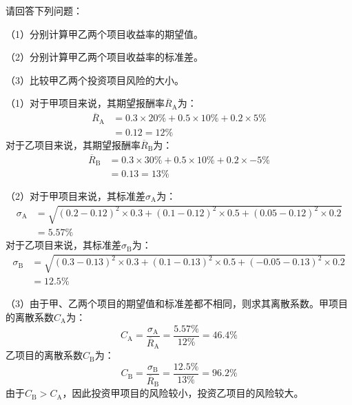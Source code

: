 \documentclass[
  10pt,
  twoside,
  openany,
  b5paper, %
  colorscheme = black, %
  xits = false,
]{qyxf-book}
\begin{document}
请回答下列问题：

（1）分别计算甲乙两个项目收益率的期望值。

（2）分别计算甲乙两个项目收益率的标准差。

（3）比较甲乙两个投资项目风险的大小。

\begin{note}
	（1）对于甲项目来说，其期望报酬率$\overline{R}_\mathrm{A}$为：
	\begin{equation*}
		\begin{aligned}
			\overline{R}_\mathrm{A} &= 0.3 \times 20\% + 0.5 \times 10\% + 0.2 \times 5\% \\
			&=  0.12 = 12\%
		\end{aligned}
	\end{equation*}
对于乙项目来说，其期望报酬率$\overline{R}_\mathrm{B}$为：
\begin{equation*}
	\begin{aligned}
		\overline{R}_\mathrm{B} &= 0.3 \times 30\% + 0.5 \times 10\% + 0.2 \times -5\% \\
		&=  0.13 = 13\%
	\end{aligned}
\end{equation*}

（2）对于甲项目来说，其标准差$\sigma_\mathrm{A}$为：
\begin{equation*}
	\begin{aligned}
		\sigma_\mathrm{A} &= \sqrt{(0.2-0.12)^2 \times 0.3 + (0.1-0.12)^2 \times 0.5 + (0.05-0.12)^2 \times 0.2 } \\
		& = 5.57\%
	\end{aligned}
\end{equation*}
对于乙项目来说，其标准差$\sigma_\mathrm{B}$为：
\begin{equation*}
	\begin{aligned}
		\sigma_\mathrm{B} &= \sqrt{(0.3-0.13)^2 \times 0.3 + (0.1-0.13)^2 \times 0.5 + (-0.05-0.13)^2 \times 0.2 } \\
		& = 12.5\%
	\end{aligned}
\end{equation*}

（3）由于甲、乙两个项目的期望值和标准差都不相同，则求其离散系数。甲项目的离散系数$C_\mathrm{A}$为：
\begin{equation*}
	C_\mathrm{A} = \frac{\sigma_\mathrm{A}}{\overline{R}_\mathrm{A}} = \frac{5.57\%}{12\%} = 46.4\%
\end{equation*}
乙项目的离散系数$C_\mathrm{B}$为：
\begin{equation*}
	C_\mathrm{B} = \frac{\sigma_\mathrm{B}}{\overline{R}_\mathrm{B}} = \frac{12.5\%}{13\%} = 96.2\%
\end{equation*}
由于$C_\mathrm{B}>C_\mathrm{A}$，因此投资甲项目的风险较小，投资乙项目的风险较大。
\end{note}
\end{document}
